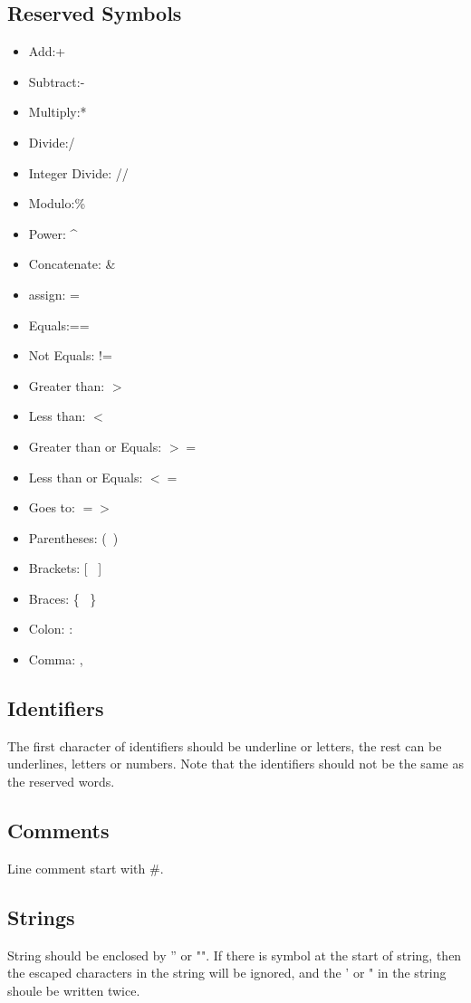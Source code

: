 \documentclass[]{article}
\begin{document}
\subsection{Reserved Symbols}
\begin{itemize}
	\item Add:+
	\item Subtract:- 
	\item Multiply:*
	\item Divide:/
	\item Integer Divide: //
	\item Modulo:\%
	\item Power: \^{}
	\item Concatenate: \&
	\item assign: =
	\item Equals:==
	\item Not Equals: !=
	\item Greater than: $>$
	\item Less than: $<$
	\item Greater than or Equals: $>=$
	\item Less than or Equals: $<=$
	\item Goes to: $=>$
	\item Parentheses: (\ )
	\item Brackets: [ \  ]
	\item Braces: \{ \ \}
	\item Colon: :
	\item Comma: ,
\end{itemize}
\subsection{Identifiers}
The first character of identifiers should be underline or letters, the rest can be underlines, letters or numbers.
Note that the identifiers should not be the same as the reserved words.

\subsection{Comments}
Line comment start with \#.

\subsection{Strings}
String should be enclosed by '' or "". If there is symbol \@ at the start of string, then the escaped characters in the string will be ignored, and the ' or " in the string shoule be written twice.
\end{document}
